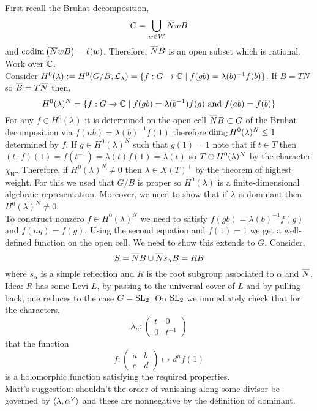 \documentclass[12pt]{article}
\begin{document}
First recall the Bruhat decomposition,
\[ G = \bigcup_{w \in W} \overline{N} w B \]
and $\mathrm{codim}\left( \overline{N} w B \right) = \ell(w)$. Therefore, $\overline{N}B$ is an open subset which is rational. 
\bigskip\\
Work over $\mathbb{C}$.
\bigskip\\
Consider $H^0(\lambda) := H^0(G/B, \mathcal{L}_\lambda) = \{ f : G \to \mathbb{C} \mid f(g b) = \lambda(b)^{-1} f(b) \}$. If $B = TN$ so $\overline{B} = T \overline{N}$ then,
\[ H^0(\lambda)^N = \{ f : G \to \mathbb{C} \mid f(g b) = \lambda(b^{-1}) f(g) \text{ and } f(ab) = f(b) \} \]
For any $f \in H^0(\lambda)$ it is determined on the open cell $\overline{N}B \subset G$ of the Bruhat decomposition via $f(nb) = \lambda(b)^{-1} f(1)$ therefore $\dim_{\mathbb{C}} H^0(\lambda)^N \le 1$ determined by $f$. If $g \in H^0(\lambda)^N$ such that $g(1) = 1$  note that if $t \in T$ then $(t \cdot f)(1) = f(t^{-1}) = \lambda(t) f(1) = \lambda(t)$ so $T \acts H^0(\lambda)^N$ by the character $\chi_W$. Therefore, if $H^0(\lambda)^N \neq 0$ then $\lambda \in X(T)^+$ by the theorem of highest weight. For this we used that $G/B$ is proper so $H^0(\lambda)$ is a finite-dimensional algebraic representation. Moreover, we need to show that if $\lambda$ is dominant then $H^0(\lambda)^N \neq 0$. 
\bigskip\\
To construct nonzero $f \in H^0(\lambda)^N$ we need to satisfy $f(gb) = \lambda(b)^{-1} f(g)$ and $f(ng) = f(g)$. Using the second equation and $f(1) = 1$ we get a well-defined function on the open cell. We need to show this extends to $G$. Consider,
\[ S = \overline{N} B \cup \overline{N} s_\alpha B = R B \]
where $s_\alpha$ is a simple reflection and $R$ is the root subgroup associated to $\alpha$ and $\overline{N}$. Idea: $R$ has some Levi $L$, by passing to the universal cover of $L$ and by pulling back, one reduces to the case $G = \mathrm{SL}_2$. On $\mathrm{SL}_2$ we immediately check that for the characters,
\[ \lambda_n : \begin{pmatrix}
t & 0 
\\
0 & t^{-1}
\end{pmatrix} \]
that the function
\[ f : \begin{pmatrix}
a & b
\\
c & d
\end{pmatrix}
\mapsto d^n f(1) \]
is a holomorphic function satisfying the required properties. 
\bigskip\\
Matt's suggestion: shouldn't the order of vanishing along some divisor be governed by $\left< \lambda, \alpha^\vee \right>$ and these are nonnegative by the definition of dominant.
\end{document}
